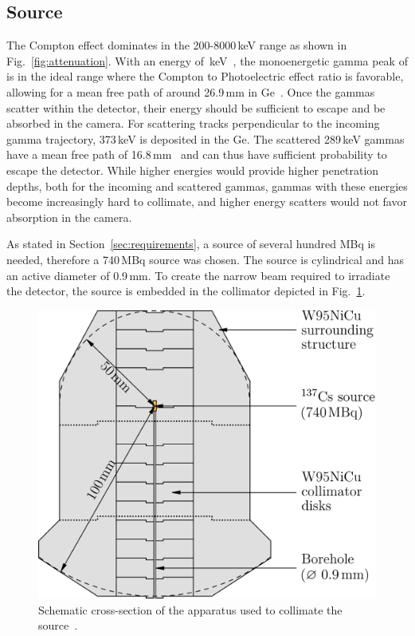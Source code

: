 \subsection{\CsS{} Source}

The Compton effect dominates in the 200-8000\,keV range as shown in Fig.~\ref{fig:attenuation}. With an energy of \Cs\,keV~\cite{Firestone}, the monoenergetic gamma peak of \CsS{} is in the ideal range where the Compton to Photoelectric effect ratio is favorable, allowing for a mean free path of around 26.9\,mm in Ge~\cite{NIST}. Once the gammas scatter within the detector, their energy should be sufficient to escape and be absorbed in the camera. For scattering tracks perpendicular to the incoming gamma trajectory, 373\,keV is deposited in the Ge. The scattered 289\,keV gammas have a mean free path of 16.8\,mm~\cite{NIST} and can thus have sufficient probability to escape the detector. While higher energies would provide higher penetration depths, both for the incoming and scattered gammas, gammas with these energies become increasingly hard to collimate, and higher energy scatters would not favor absorption in the camera. 

As stated in Section~\ref{sec:requirements}, a source of several hundred MBq is needed, therefore a 740\,MBq \CsS{} source was chosen. The source is cylindrical and has an active diameter of 0.9\,mm. To create the narrow beam required to irradiate the detector, the source is embedded in the collimator depicted in Fig.~\ref{fig:sourcecollimator}.

\begin{figure}[tbph]
	\centering
	\includegraphics{figs/scanner/ComptonScanner_SourceCollimator_updated_labeled_width_4in.png}
	\caption{Schematic cross-section of the apparatus used to collimate the \CsS{} source~\cite{compton_scanner}.}
	\label{fig:sourcecollimator}
\end{figure}

